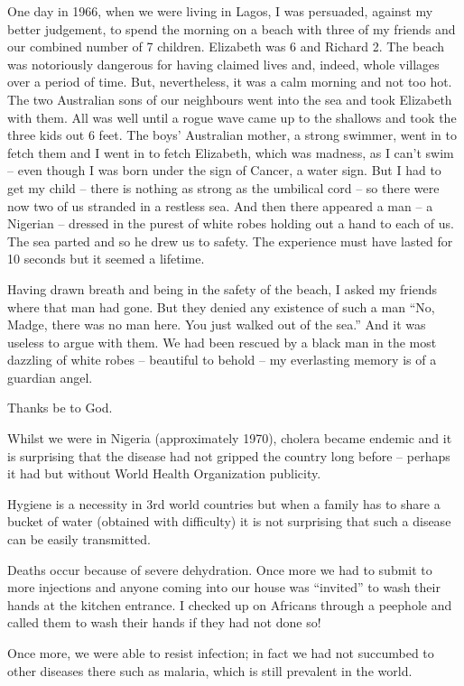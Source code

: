 One day in 1966, when we were living in Lagos, I was persuaded,
against my better judgement, to spend the morning on a beach with
three of my friends and our combined number of 7 children. Elizabeth
was 6 and Richard 2. The beach was notoriously dangerous for having
claimed lives and, indeed, whole villages over a period of time. But,
nevertheless, it was a calm morning and not too hot. The two
Australian sons of our neighbours went into the sea and took Elizabeth
with them. All was well until a rogue wave came up to the shallows and
took the three kids out 6 feet. The boys' Australian mother, a strong
swimmer, went in to fetch them and I went in to fetch Elizabeth, which
was madness, as I can't swim -- even though I was born under the sign
of Cancer, a water sign. But I had to get my child -- there is nothing
as strong as the umbilical cord -- so there were now two of us
stranded in a restless sea. And then there appeared a man -- a
Nigerian -- dressed in the purest of white robes holding out a hand to
each of us. The sea parted and so he drew us to safety. The experience
must have lasted for 10 seconds but it seemed a lifetime.

Having drawn breath and being in the safety of the beach, I asked my
friends where that man had gone. But they denied any existence of such
a man ``No, Madge, there was no man here. You just walked out of the
sea.'' And it was useless to argue with them. We had been rescued by a
black man in the most dazzling of white robes -- beautiful to behold
-- my everlasting memory is of a guardian angel.

Thanks be to God.

Whilst we were in Nigeria (approximately 1970), cholera became endemic
and it is surprising that the disease had not gripped the country long
before -- perhaps it had but without World Health Organization
publicity.

Hygiene is a necessity in 3rd world countries but when a family has to
share a bucket of water (obtained with difficulty) it is not
surprising that such a disease can be easily transmitted.

Deaths occur because of severe dehydration. Once more we had to submit
to more injections and anyone coming into our house was ``invited'' to
wash their hands at the kitchen entrance. I checked up on Africans
through a peephole and called them to wash their hands if they had not
done so!

Once more, we were able to resist infection; in fact we had not
succumbed to other diseases there such as malaria, which is still
prevalent in the world.

